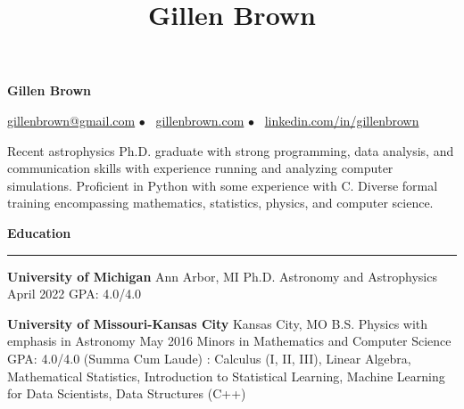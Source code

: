 \documentclass[10pt]{article}
\title{Gillen Brown}
\newcommand{\spacer}{$\bullet$ \ }
\newcommand{\header}[1]{\vspace{0.7em}\par \textbf{\large #1}\strut\hrule\vspace{-0.6em}}
\newcommand{\actionHeader}[2]{\vspace{0.3em}\textbf{#1} \hfill #2}
\newcommand{\indentedItemDate}[2]{\newline\null\qquad #1 \hfill #2}
\newcommand{\indentedItem}[1]{\newline\null\qquad #1}
\begin{document}
\thispagestyle{empty}


\begin{center}
{\LARGE \bf Gillen Brown}

{\normalsize \href{mailto:gillenbrown@gmail.com}{gillenbrown@gmail.com} \spacer \href{https://www.gillenbrown.com}{gillenbrown.com} \spacer \href{http://www.linkedin.com/in/gillenbrown}{linkedin.com/in/gillenbrown}}
\end{center}

\medskip
Recent astrophysics Ph.D. graduate with strong programming, data analysis, and communication skills with experience running and analyzing computer simulations. Proficient in Python with some experience with C. Diverse formal training encompassing mathematics, statistics, physics, and computer science.

\header{Education}
\actionHeader{University of Michigan}{Ann Arbor, MI}
\indentedItemDate{Ph.D. Astronomy and Astrophysics}{April 2022}
\indentedItem{GPA: 4.0/4.0}
\vspace{-0.5em}

\actionHeader{University of Missouri-Kansas City}{Kansas City, MO}
\indentedItemDate{B.S. Physics with emphasis in Astronomy}{May 2016}
\indentedItem{Minors in Mathematics and Computer Science}
\indentedItem{GPA: 4.0/4.0  (Summa Cum Laude)}
\indentedItem{{\bf Relevant Coursework}: Calculus (I, II, III), Linear Algebra, Mathematical Statistics, Introduction to Statistical}
\indentedItem{\qquad Learning, Machine Learning for Data Scientists, Data Structures (C++)}
\vspace{-0.3em}  
\end{document}
